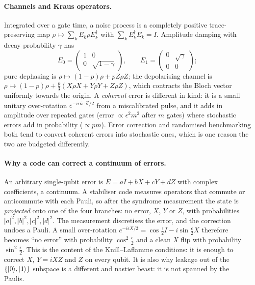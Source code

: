 \paragraph{Channels and Kraus operators.} Integrated over a gate time, a noise process is a
completely positive trace-preserving map $\rho\mapsto\sum_kE_k\rho E_k^\dagger$ with
$\sum_kE_k^\dagger E_k=I$. Amplitude damping with decay probability $\gamma$ has
\[ E_0=\begin{pmatrix}1&0\\0&\sqrt{1-\gamma}\end{pmatrix},\qquad
   E_1=\begin{pmatrix}0&\sqrt\gamma\\0&0\end{pmatrix}; \]
pure dephasing is $\rho\mapsto(1-p)\rho+pZ\rho Z$; the depolarising channel is
$\rho\mapsto(1-p)\rho+\tfrac p3(X\rho X+Y\rho Y+Z\rho Z)$, which contracts the Bloch vector
uniformly towards the origin. A \emph{coherent} error is different in kind: it is a small unitary
over-rotation $e^{-i\epsilon\hat n\cdot\vec\sigma/2}$ from a miscalibrated pulse, and it adds in
amplitude over repeated gates (error $\propto\epsilon^2m^2$ after $m$ gates) where stochastic
errors add in probability ($\propto pm$). Error correction and randomised benchmarking both tend
to convert coherent errors into stochastic ones, which is one reason the two are budgeted
differently.

\paragraph{Why a code can correct a continuum of errors.} An arbitrary single-qubit error is
$E=aI+bX+cY+dZ$ with complex coefficients, a continuum. A stabiliser code measures operators
that commute or anticommute with each Pauli, so after the syndrome measurement the state is
\emph{projected} onto one of the four branches: no error, $X$, $Y$ or $Z$, with probabilities
$|a|^2,|b|^2,|c|^2,|d|^2$. The measurement discretises the error, and the correction undoes a
Pauli. A small over-rotation $e^{-i\epsilon X/2}=\cos\frac\epsilon2I-i\sin\frac\epsilon2X$
therefore becomes ``no error'' with probability $\cos^2\frac\epsilon2$ and a clean $X$ flip with
probability $\sin^2\frac\epsilon2$. This is the content of the Knill--Laflamme conditions: it is
enough to correct $X$, $Y=iXZ$ and $Z$ on every qubit. It is also why leakage out of the
$\{\lvert 0 \rangle,\lvert 1 \rangle\}$ subspace is a different and nastier beast: it is not spanned by the Paulis.

